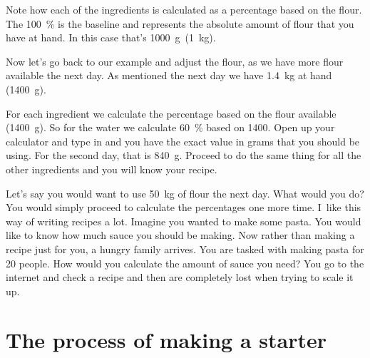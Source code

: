 Note how each of the ingredients is calculated as a percentage
based on the flour. The \qty{100}{\percent} is the baseline and represents the absolute
amount of flour that you have at hand. In this case that's
\qty{1000}{\gram}~(\qty{1}{\kg}).

Now let's go back to our example and adjust the flour, as we have
more flour available the next day. As mentioned the next day
we have \qty{1.4}{\kg} at hand (\qty{1400}{\gram}).

\begin{table}[!htb]
    \centering
        
        \caption[Another baker's math example]{An example recipe that uses
            \qty{1400}{\gram} as its baseline and is then calculated using
            baker's math.}
\end{table}

For each ingredient we calculate the percentage
based on the flour available (\qty{1400}{\gram}). So for the water
we calculate \qty{60}{\percent} based on \num{1400}. Open up your
calculator and type in  and you have
the exact value in grams that you should be using.
For the second day, that is \qty{840}{\gram}. Proceed to do the same
thing for all the other ingredients and you will know
your recipe.

Let's say you would want to use \qty{50}{\kg} of flour
the next day. What would you do? You would simply proceed
to calculate the percentages one more time. I~like this
way of writing recipes a lot. Imagine you wanted to make
some pasta. You would like to know how much sauce you should
be making. Now rather than making a recipe just for you, a
hungry family arrives. You are tasked with making pasta
for \num{20} people. How would you calculate the amount of sauce
you need? You go to the internet and check a recipe and then
are completely lost when trying to scale it up.

\section{The process of making a starter}

